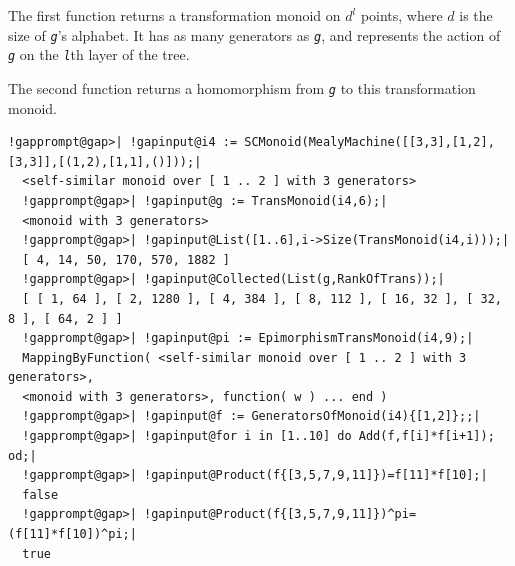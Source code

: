 \documentclass[a4paper,11pt]{report}
\begin{document}
{{{ The first function returns a transformation monoid on $d^l$ points, where $d$ is the size of \mbox{\texttt{\mdseries\slshape g}}'s alphabet. It has as many generators as \mbox{\texttt{\mdseries\slshape g}}, and represents the action of \mbox{\texttt{\mdseries\slshape g}} on the \mbox{\texttt{\mdseries\slshape l}}th layer of the tree. 

 The second function returns a homomorphism from \mbox{\texttt{\mdseries\slshape g}} to this transformation monoid. 
\begin{Verbatim}[commandchars=!@|,fontsize=\small,frame=single,label=Example]
  !gapprompt@gap>| !gapinput@i4 := SCMonoid(MealyMachine([[3,3],[1,2],[3,3]],[(1,2),[1,1],()]));|
  <self-similar monoid over [ 1 .. 2 ] with 3 generators>
  !gapprompt@gap>| !gapinput@g := TransMonoid(i4,6);|
  <monoid with 3 generators>
  !gapprompt@gap>| !gapinput@List([1..6],i->Size(TransMonoid(i4,i)));|
  [ 4, 14, 50, 170, 570, 1882 ]
  !gapprompt@gap>| !gapinput@Collected(List(g,RankOfTrans));|
  [ [ 1, 64 ], [ 2, 1280 ], [ 4, 384 ], [ 8, 112 ], [ 16, 32 ], [ 32, 8 ], [ 64, 2 ] ]
  !gapprompt@gap>| !gapinput@pi := EpimorphismTransMonoid(i4,9);|
  MappingByFunction( <self-similar monoid over [ 1 .. 2 ] with 3 generators>,
  <monoid with 3 generators>, function( w ) ... end )
  !gapprompt@gap>| !gapinput@f := GeneratorsOfMonoid(i4){[1,2]};;|
  !gapprompt@gap>| !gapinput@for i in [1..10] do Add(f,f[i]*f[i+1]); od;|
  !gapprompt@gap>| !gapinput@Product(f{[3,5,7,9,11]})=f[11]*f[10];|
  false
  !gapprompt@gap>| !gapinput@Product(f{[3,5,7,9,11]})^pi=(f[11]*f[10])^pi;|
  true
\end{Verbatim}
 }

 

}}
\end{document}
